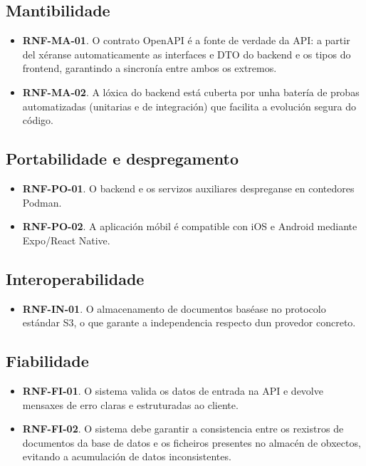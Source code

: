 \subsection{Mantibilidade}

\begin{itemize}
  \item \textbf{RNF-MA-01}. O contrato OpenAPI é a fonte de verdade da API: a partir del xéranse automaticamente as interfaces e DTO do backend e os tipos do frontend, garantindo a sincronía entre ambos os extremos.
  \item \textbf{RNF-MA-02}. A lóxica do backend está cuberta por unha batería de probas automatizadas (unitarias e de integración) que facilita a evolución segura do código.
\end{itemize}

\subsection{Portabilidade e despregamento}

\begin{itemize}
  \item \textbf{RNF-PO-01}. O backend e os servizos auxiliares despreganse en contedores Podman.
  \item \textbf{RNF-PO-02}. A aplicación móbil é compatible con iOS e Android mediante Expo/React Native.
\end{itemize}

\subsection{Interoperabilidade}

\begin{itemize}
  \item \textbf{RNF-IN-01}. O almacenamento de documentos baséase no protocolo estándar S3, o que garante a independencia respecto dun provedor concreto.
\end{itemize}

\subsection{Fiabilidade}

\begin{itemize}
  \item \textbf{RNF-FI-01}. O sistema valida os datos de entrada na API e devolve mensaxes de erro claras e estruturadas ao cliente.
  \item \textbf{RNF-FI-02}. O sistema debe garantir a consistencia entre os rexistros de documentos da base de datos e os ficheiros presentes no almacén de obxectos, evitando a acumulación de datos inconsistentes.
\end{itemize}


